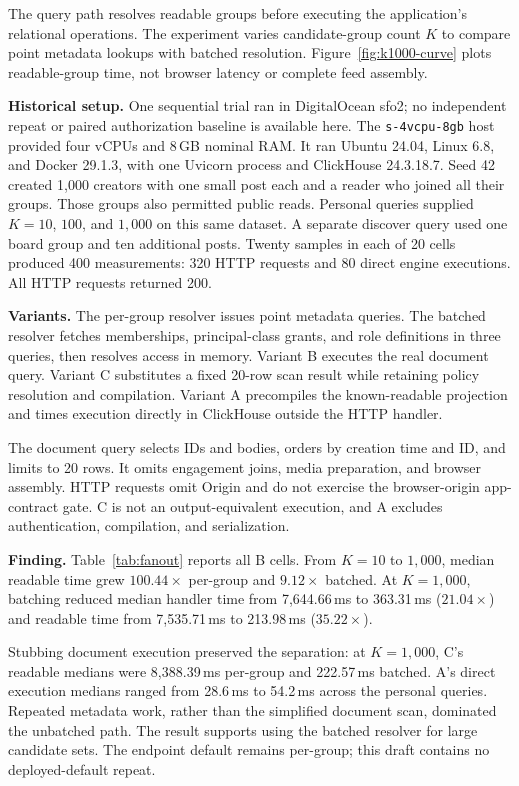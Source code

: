 \documentclass[sigconf, nonacm]{acmart}
\begin{document}
The query path resolves readable groups before executing the application's
relational operations. The experiment varies candidate-group count
$K$ to compare point metadata lookups with batched resolution.
Figure~\ref{fig:k1000-curve} plots readable-group time, not browser
latency or complete feed assembly.

\textbf{Historical setup.} One sequential trial ran in DigitalOcean sfo2;
no independent repeat or paired authorization baseline is available here.
The \texttt{s-4vcpu-8gb} host provided four vCPUs and 8\,GB nominal RAM.
It ran Ubuntu 24.04, Linux 6.8, and Docker 29.1.3, with one Uvicorn
process and ClickHouse 24.3.18.7.
Seed 42 created 1,000 creators with one small post each and a reader who
joined all their groups. Those groups also permitted public reads.
Personal queries supplied $K=10$, $100$, and $1{,}000$ on this same
dataset. A separate discover query used one board group and ten
additional posts. Twenty samples in each of 20 cells produced 400
measurements: 320 HTTP requests and 80 direct engine executions.
All HTTP requests returned 200.

\textbf{Variants.} The per-group resolver issues point metadata queries.
The batched resolver fetches memberships, principal-class grants, and
role definitions in three queries, then resolves access in memory.
Variant B executes the real document query. Variant C substitutes a
fixed 20-row scan result while retaining policy resolution and
compilation. Variant A precompiles the known-readable projection and
times execution directly in ClickHouse outside the HTTP handler.

The document query selects IDs and bodies, orders by creation time and
ID, and limits to 20 rows. It omits engagement joins, media preparation,
and browser assembly. HTTP requests omit Origin and do not exercise the
browser-origin app-contract gate. C is not an output-equivalent
execution, and A excludes authentication, compilation, and serialization.

\textbf{Finding.} Table~\ref{tab:fanout} reports all B cells.
From $K=10$ to $1{,}000$, median readable time grew $100.44\times$
per-group and $9.12\times$ batched. At $K=1{,}000$, batching reduced
median handler time from 7,644.66\,ms to 363.31\,ms ($21.04\times$)
and readable time from 7,535.71\,ms to 213.98\,ms ($35.22\times$).

Stubbing document execution preserved the separation: at $K=1{,}000$,
C's readable medians were 8,388.39\,ms per-group and 222.57\,ms batched.
A's direct execution medians ranged from 28.6\,ms to 54.2\,ms across the
personal queries. Repeated metadata work, rather than the simplified
document scan, dominated the unbatched path. The result supports using
the batched resolver for large candidate sets. The endpoint default
remains per-group; this draft contains no deployed-default repeat.
\end{document}
